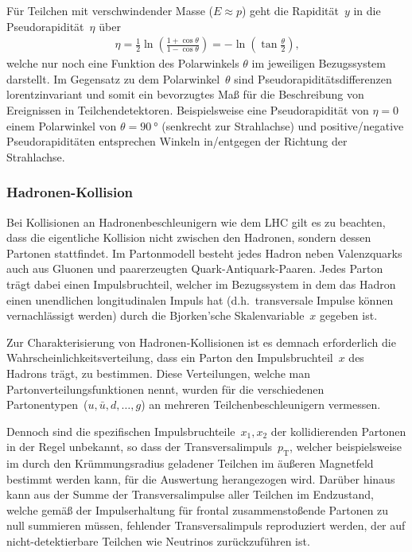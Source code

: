 \documentclass[11pt, a4paper]{article}
\numberwithin{equation}{section}
\begin{document}
Für Teilchen mit verschwindender Masse ($E \approx p$) geht die Rapidität~$y$ in die Pseudorapidität~$\eta$ über \cite{script}
\begin{align}
	\eta = \frac{1}{2} \ln\left( \frac{1 + \cos\theta}{1 - \cos\theta} \right) = - \ln\left( \tan\frac{\theta}{2} \right)\text{,}
	\label{eq:pseudorapidity}
\end{align}
welche nur noch eine Funktion des Polarwinkels $\theta$ im jeweiligen Bezugssystem darstellt.
Im Gegensatz zu dem Polarwinkel~$\theta$ sind Pseudorapiditätsdifferenzen lorentzinvariant und somit ein bevorzugtes Maß für die Beschreibung von Ereignissen in Teilchendetektoren.
Beispielsweise eine Pseudorapidität von $\eta = \num{0}$ einem Polarwinkel von $\theta = \SI{90}{\degree}$ (senkrecht zur Strahlachse) und positive/negative Pseudorapiditäten entsprechen Winkeln in/entgegen der Richtung der Strahlachse.

\subsubsection{Hadronen-Kollision}
\label{sssec:hadronen_kollision}
Bei Kollisionen an Hadronenbeschleunigern wie dem LHC gilt es zu beachten, dass die eigentliche Kollision nicht zwischen den Hadronen, sondern dessen Partonen stattfindet.
Im Partonmodell besteht jedes Hadron neben Valenzquarks auch aus Gluonen und paarerzeugten Quark-Antiquark-Paaren.
Jedes Parton trägt dabei einen Impulsbruchteil, welcher im Bezugssystem in dem das Hadron einen unendlichen longitudinalen Impuls hat (d.h.\ transversale Impulse können vernachlässigt werden) durch die Bjorken'sche Skalenvariable~$x$ gegeben ist.

Zur Charakterisierung von Hadronen-Kollisionen ist es demnach erforderlich die Wahrscheinlichkeitsverteilung, dass ein Parton den Impulsbruchteil~$x$ des Hadrons trägt, zu bestimmen.
Diese Verteilungen, welche man Partonverteilungsfunktionen nennt, wurden für die verschiedenen Partonentypen~($u, \bar{u}, d, \dots, g$) an mehreren Teilchenbeschleunigern vermessen.

Dennoch sind die spezifischen Impulsbruchteile~$x_1, x_2$ der kollidierenden Partonen in der Regel unbekannt, so dass der Transversalimpuls~$p_\mathrm{T}$, welcher beispielsweise im durch den Krümmungsradius geladener Teilchen im äußeren Magnetfeld bestimmt werden kann, für die Auswertung herangezogen wird.
Darüber hinaus kann aus der Summe der Transversalimpulse aller Teilchen im Endzustand, welche gemäß der Impulserhaltung für frontal zusammenstoßende Partonen zu null summieren müssen, fehlender Transversalimpuls reproduziert werden, der auf nicht-detektierbare Teilchen wie Neutrinos zurückzuführen ist.
\end{document}
